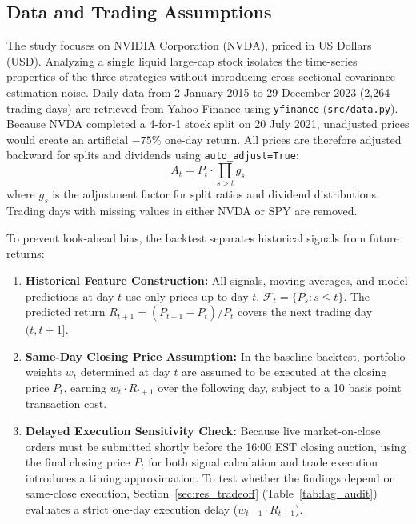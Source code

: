 \documentclass[11pt, a4paper]{article}
\begin{document}
\subsection{Data and Trading Assumptions}
\label{sec:market}

The study focuses on NVIDIA Corporation (NVDA), priced in US Dollars (USD). Analyzing a single liquid large-cap stock isolates the time-series properties of the three strategies without introducing cross-sectional covariance estimation noise. Daily data from 2 January 2015 to 29 December 2023 (2,264 trading days) are retrieved from Yahoo Finance using \texttt{yfinance} (\texttt{src/data.py}). Because NVDA completed a 4-for-1 stock split on 20 July 2021, unadjusted prices would create an artificial $-75\%$ one-day return. All prices are therefore adjusted backward for splits and dividends using \texttt{auto\_adjust=True}:
\begin{equation}
A_t = P_t \cdot \prod_{s > t} g_s
\end{equation}
where $g_s$ is the adjustment factor for split ratios and dividend distributions. Trading days with missing values in either NVDA or SPY are removed.

To prevent look-ahead bias, the backtest separates historical signals from future returns:
\begin{enumerate}
    \item \textbf{Historical Feature Construction:} All signals, moving averages, and model predictions at day $t$ use only prices up to day $t$, $\mathcal{F}_t = \{P_s : s \le t\}$. The predicted return $R_{t+1} = (P_{t+1} - P_t)/P_t$ covers the next trading day $(t, t+1]$.
    \item \textbf{Same-Day Closing Price Assumption:} In the baseline backtest, portfolio weights $w_t$ determined at day $t$ are assumed to be executed at the closing price $P_t$, earning $w_t \cdot R_{t+1}$ over the following day, subject to a 10 basis point transaction cost.
    \item \textbf{Delayed Execution Sensitivity Check:} Because live market-on-close orders must be submitted shortly before the 16:00 EST closing auction, using the final closing price $P_t$ for both signal calculation and trade execution introduces a timing approximation. To test whether the findings depend on same-close execution, Section~\ref{sec:res_tradeoff} (Table~\ref{tab:lag_audit}) evaluates a strict one-day execution delay ($w_{t-1} \cdot R_{t+1}$).
\end{enumerate}
\end{document}
